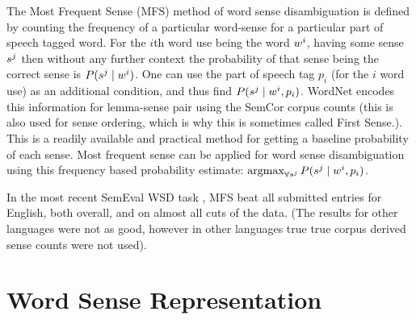 \documentclass[12pt,parskip]{komatufte}
\begin{document}
The Most Frequent Sense (MFS) method of word sense disambiguation is defined by counting the frequency of a particular word-sense for a particular part of speech tagged word.
For the $i$th word use being the word $\n w_i$, having some sense $\n s_j$
then without any further context the 
probability of that sense being the correct sense is $P(\n s_j \mid \n w_i)$.
One can use the part of speech tag $p_i$ (for the $i$ word use) as an additional condition, and thus find $P(\n s_j \mid \n w_i, p_i)$.
WordNet encodes this information for lemma-sense pair using the SemCor corpus counts (this is also used for sense ordering, which is why this is sometimes called First Sense.).
This is a readily available and practical method for getting a baseline probability of each sense.
Most frequent sense can be applied for word sense disambiguation using this frequency based probability estimate:  $\argmax_{\forall \n s_j} P(\n s_j \mid \n w_i, p_i)$.


In the most recent SemEval WSD task ,
MFS beat all submitted entries for English, both overall, and on almost all cuts of the data.
(The results for other languages were not as good, however in other languages true true corpus derived sense counts were not used).



\section{Word Sense Representation}
\end{document}
